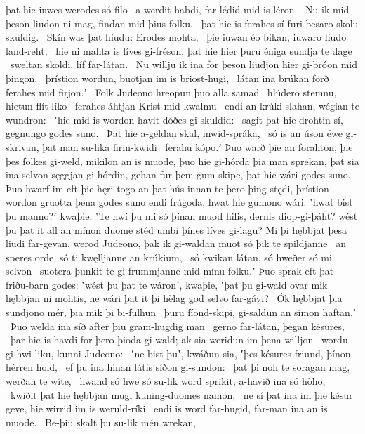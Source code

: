 þat hie iuwes werodes só filo \hld\ a-werdit habdi,
far-lédid mid is léron. \hld\ Nu ik mid þeson liudon ni mag,
findan mid þius folku, \hld\ þat hie is ferahes sí
furi þesaro skolu skuldig. \hld\ Skín was þat hiudu:
Erodes mohta, \hld\ þie iuwan éo bikan,
iuwaro liudo land-reht, \hld\ hie ni mahta is líves gi-fréson,
þat hie hier þuru éniga sundja te dage \hld\ sweltan skoldi,
líf far-látan. \hld\ Nu willju ik ina for þeson liudjon hier
gi-þróon mid þingon, \hld\ þrístion wordun,
buotjan im is briost-hugi, \hld\ látan ina brúkan forð
ferahes mid firjon.ʼ \hld\ Folk Judeono
hreopun þuo alla samad \hld\ hlúdero stemnu,
hietun flít-líko \hld\ ferahes áhtjan
Krist mid kwalmu \hld\ endi an krúki slahan,
wégian te wundron: \hld\ ʽhie mid is wordon havit
dóðes gi-skuldid: \hld\ sagit þat hie drohtin sí,
gegnungo godes suno. \hld\ Þat hie a-geldan skal,
inwid-spráka, \hld\ só is an úson éwe gi-skrivan,
þat man su-lika firin-kwidi \hld\ ferahu kópo.ʼ
Þuo warð þie an forahton, þie þes folkes gi-weld,
mikilon an is muode, þuo hie gi-hórda þia man sprekan,
þat sia ina selvon sęggjan gi-hórdin,
gehan fur þem gum-skipe, þat hie wári godes suno.
Þuo hwarf im eft þie hęri-togo an þat hús innan
te þero þing-stędi, þrístion wordon
gruotta þena godes suno endi frágoda, hwat hie gumono wári:
ʽhwat bist þu manno?ʼ kwaþie. ʽTe hwí þu mi só þínan muod hilis,
dernis diop-gi-þáht? wést þu þat it all an mínon duome stéd
umbi þínes líves gi-lagu? Mi þi hębbjat þesa liudi far-gevan,
werod Judeono, þak ik gi-waldan muot
só þik te spildjanne \hld\ an speres orde,
só ti kwęlljanne an krúkium, \hld\ só kwikan látan,
só hweðer só mi selvon \hld\ suotera þunkit
te gi-frummjanne mid mínu folku.ʼ Þuo sprak eft þat friðu-barn godes:
ʽwést þu þat te wáronʼ, kwaþie, ʽþat þu gi-wald ovar mik
hębbjan ni mohtis, ne wári þat it þi hèlag god
selvo far-gávi? \hld\ Ók hębbjat þia sundjono mér,
þia mik þi bi-fulhun \hld\ þuru fíond-skipi,
gi-saldun an símon haftan.ʼ \hld\ Þuo welda ina síð after þiu
gram-hugdig man \hld\ gerno far-látan,
þegan késures, \hld\ þar hie is havdi for þero þioda gi-wald;
ak sia weridun im þena willjon \hld\ wordu gi-hwi-liku,
kunni Judeono: \hld\ ʽne bist þuʼ, kwáðun sia, ʽþes késures friund,
þínon hérren hold, \hld\ ef þu ina hinan látis
síðon gi-sundon: \hld\ þat þi noh te soragan mag,
werðan te wíte, \hld\ hwand só hwe só su-lik word sprikit,
a-havið ina só hòho, \hld\ kwiðit þat hie hębbjan mugi
kuning-duomes namon, \hld\ ne sí þat ina im þie késur geve,
hie wirrid im is weruld-ríki \hld\ endi is word far-hugid,
far-man ina an is muode. \hld\ Be-þiu skalt þu su-lik mén wrekan,
